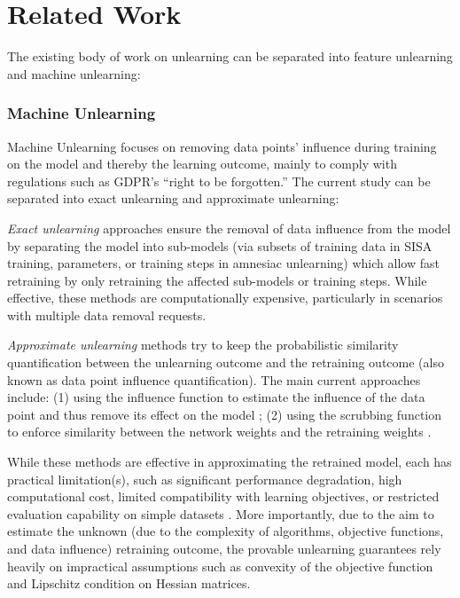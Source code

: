 \section{Related Work}
\label{s:related_work}

The existing body of work on unlearning can be separated into feature unlearning and machine unlearning:

\subsubsection{Machine Unlearning}

Machine Unlearning focuses on removing data points' influence during training on the model and thereby the learning outcome, mainly to comply with regulations such as GDPR’s “right to be forgotten.” The current study can be separated into exact unlearning and approximate unlearning:

\textit{Exact unlearning} \cite{bourtoule2021machine, brophy2021machine, yan2022arcane, graves2021amnesiac, schelter2021hedgecut, ginart2019making, chen2022graph, chen2022recommendation} approaches ensure the removal of data influence from the model by separating the model into sub-models (via subsets of training data in SISA training, parameters, or training steps in amnesiac unlearning) which allow fast retraining by only retraining the affected sub-models or training steps. While effective, these methods are computationally expensive, particularly in scenarios with multiple data removal requests. 

\textit{Approximate unlearning} methods try to keep the probabilistic similarity quantification between the unlearning outcome and the retraining outcome (also known as data point influence quantification). The main current approaches include: (1) using the influence function \cite{weisberg1982residuals} to estimate the influence of the data point and thus remove its effect on the model \cite{guo2020certified, sekhari2021remember, suriyakumar2022algorithms, mehta2022deep, wu2022puma, tanno2022repairing, warnecke2021machine}; (2) using the scrubbing function to enforce similarity between the network weights and the retraining weights \cite{golatkar2020eternal, golatkar2020forgetting}.

While these methods are effective in approximating the retrained model, each has practical limitation(s), such as significant performance degradation, high computational cost, limited compatibility with learning objectives, or restricted evaluation capability on simple datasets \cite{nguyen2022survey, wang2024machine}. More importantly, due to the aim to estimate the unknown (due to the complexity of algorithms, objective functions, and data influence) retraining outcome, the provable unlearning guarantees rely heavily on impractical assumptions such as convexity of the objective function and Lipschitz condition on Hessian matrices. \cite{xu2024machine}

